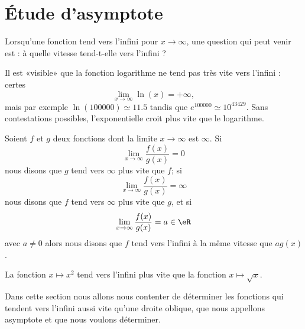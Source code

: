 
\section{Étude d'asymptote}

Lorsqu'une fonction tend vers l'infini pour \( x\to \infty\), une question qui peut venir est : à quelle vitesse tend-t-elle vers l'infini ?

Il est «visible» que la fonction logarithme ne tend pas très vite vers l'infini : certes
\begin{equation}
    \lim_{x\to \infty} \ln(x)=+\infty,
\end{equation}
mais par exemple \( \ln(100000)\simeq 11.5\) tandis que \(  e^{100000}\simeq 10^{43429}\). Sans contestations possibles, l'exponentielle croit plus vite que le logarithme.

Soient \( f\) et \( g\) deux fonctions dont la limite \( x\to \infty\) est \( \infty\). Si
\begin{equation}
    \lim_{x\to \infty} \frac{ f(x) }{ g(x) }=0
\end{equation}
nous disons que \( g\) tend vers \( \infty\) plus vite que \( f\); si
\begin{equation}
    \lim_{x\to \infty} \frac{ f(x) }{ g(x) }=\infty
\end{equation}
nous disons que \( f\) tend vers \( \infty\) plus vite que \( g\), et si
\begin{equation}
    \lim_{x\to \infty} \frac{ f(x) }{ g(x) }=a\in \eR
\end{equation}
avec \( a\neq 0\) alors nous disons que \( f\) tend vers l'infini à la même vitesse que \( ag(x)\).

\begin{example}
    La fonction \( x\mapsto x^2\) tend vers l'infini plus vite que la fonction \( x\mapsto \sqrt{x}\).
\end{example}

Dans cette section nous allons nous contenter de déterminer les fonctions qui tendent vers l'infini aussi vite qu'une droite oblique, que nous appellons asymptote et que nous voulons déterminer.


